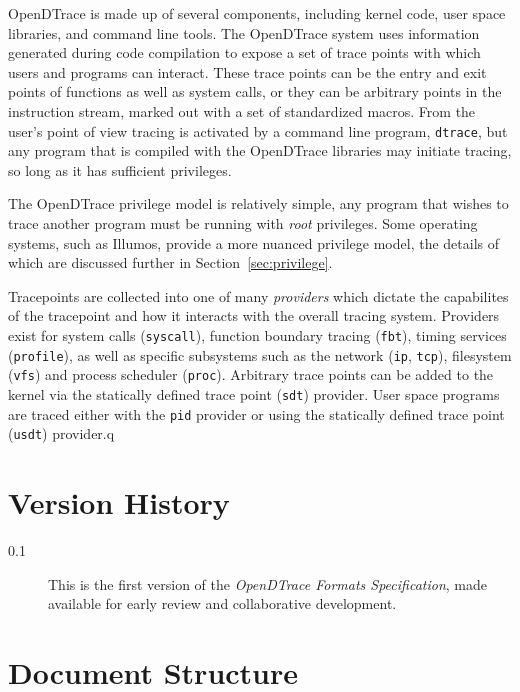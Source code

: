 OpenDTrace is made up of several components, including kernel code,
user space libraries, and command line tools.  The OpenDTrace system
uses information generated during code compilation to expose a set of
trace points with which users and programs can interact.  These trace
points can be the entry and exit points of functions as well as system
calls, or they can be arbitrary points in the instruction stream,
marked out with a set of standardized macros.  From the user's point
of view tracing is activated by a command line program,
\texttt{dtrace}, but any program that is compiled with the OpenDTrace
libraries may initiate tracing, so long as it has sufficient
privileges.

The OpenDTrace privilege model is relatively simple, any program that
wishes to trace another program must be running with \emph{root}
privileges.  Some operating systems, such as Illumos, provide a more
nuanced privilege model, the details of which are discussed further in
Section~\ref{sec:privilege}.

Tracepoints are collected into one of many \emph{providers} which dictate
the capabilites of the tracepoint and how it interacts with the overall
tracing system.  Providers exist for system calls (\texttt{syscall}),
function boundary tracing (\texttt{fbt}), timing services (\texttt{profile}),
as well as specific subsystems such as the network (\texttt{ip}, \texttt{tcp}),
filesystem (\texttt{vfs}) and process scheduler (\texttt{proc}).
Arbitrary trace points can be added to the kernel via the
statically defined trace point (\texttt{sdt}) provider.  User space programs
are traced either with the \texttt{pid} provider or using the 
statically defined trace point (\texttt{usdt}) provider.q

\section{Version History}

\begin{description}
\item[0.1] This is the first version of the \textit{OpenDTrace Formats
  Specification}, made available for early review and collaborative
  development.
\end{description}

\section{Document Structure}

